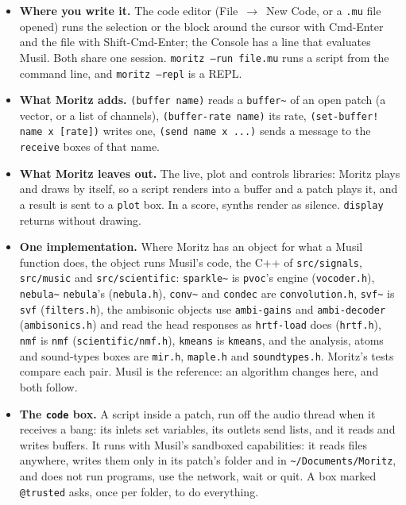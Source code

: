 \documentclass[11pt,a4paper]{article}
\newcommand{\musil}[1]{\lstinline[style=musilinline]{#1}}
\begin{document}
\begin{itemize}[nosep]
  \item \textbf{Where you write it.} The code editor (File~$\to$~New Code, or a
        \texttt{.mu} file opened) runs the selection or the block around the cursor with
        Cmd-Enter and the file with Shift-Cmd-Enter; the Console has a line that evaluates Musil. Both share one
        session. \texttt{moritz --run file.mu} runs a script from the command line, and
        \texttt{moritz --repl} is a REPL.
  \item \textbf{What Moritz adds.} \musil{(buffer name)} reads a \texttt{buffer\textasciitilde}
        of an open patch (a vector, or a list of channels), \musil{(buffer-rate name)} its
        rate, \musil{(set-buffer! name x [rate])} writes one, \musil{(send name x ...)}
        sends a message to the \texttt{receive} boxes of that name.
  \item \textbf{What Moritz leaves out.} The live, plot and controls libraries: Moritz plays
        and draws by itself, so a script renders into a buffer and a patch plays it, and a
        result is sent to a \texttt{plot} box. In a score, synths render as silence.
        \musil{display} returns without drawing.
  \item \textbf{One implementation.} Where Moritz has an object for what a Musil function
        does, the object runs Musil's code, the C++ of \texttt{src/signals},
        \texttt{src/music} and \texttt{src/scientific}: \texttt{sparkle\textasciitilde} is
        \musil{pvoc}'s engine (\texttt{vocoder.h}), \texttt{nebula\textasciitilde}
        \musil{nebula}'s (\texttt{nebula.h}), \texttt{conv\textasciitilde} and
        \texttt{condec} are \texttt{convolution.h}, \texttt{svf\textasciitilde} is
        \musil{svf} (\texttt{filters.h}), the ambisonic objects use \musil{ambi-gains} and
        \musil{ambi-decoder} (\texttt{ambisonics.h}) and read the head responses as
        \musil{hrtf-load} does (\texttt{hrtf.h}), \texttt{nmf} is \musil{nmf}
        (\texttt{scientific/nmf.h}), \texttt{kmeans} is \musil{kmeans}, and the analysis,
        atoms and sound-types boxes are \texttt{mir.h}, \texttt{maple.h} and
        \texttt{soundtypes.h}. Moritz's tests compare each pair. Musil is the reference:
        an algorithm changes here, and both follow.
  \item \textbf{The \texttt{code} box.} A script inside a patch, run off the audio thread
        when it receives a bang: its inlets set variables, its outlets send lists, and it
        reads and writes buffers. It runs with Musil's sandboxed capabilities: it reads files
        anywhere, writes them only in its patch's folder and in \texttt{\textasciitilde/Documents/Moritz},
        and does not run programs, use the network, wait or quit. A box marked
        \texttt{@trusted} asks, once per folder, to do everything.
\end{itemize}
\end{document}
